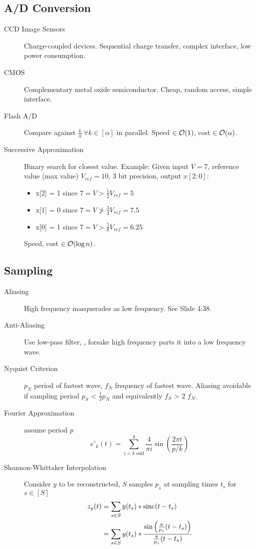 
\subsection{A/D Conversion}
\begin{description}
	\item[CCD Image Sensors] Charge-coupled devices. Sequential charge transfer,
	complex interface, low power consumption.
	\item[CMOS] Complementary metal oxide semiconductor. Cheap, random access,
	simple interface.
	\item[Flash A/D] Compare against $\frac{k}{\alpha} \ \forall k \in [\alpha]$
	in parallel. Speed $\in \operatorname{\mathcal{O}}(1)$, cost $\in \operatorname{\mathcal{O}}(\alpha)$.
	\item[Successive Approximation] Binary search for closest value. Example:
	Given input $V = 7$, reference value (max value) $V_{ref} = 10$, 3 bit
	precision,
	output $x[2:0]$:
	\begin{itemize}
		\item x[2] = 1 since $7 = V > \frac{1}{2} V_{ref} = 5$
		\item x[1] = 0 since $7 = V \ngtr \frac{3}{4} V_{ref} = 7.5$
		\item x[0] = 1 since $7 = V > \frac{5}{8} V_{ref} = 6.25$
	\end{itemize}
	Speed, cost $\in \operatorname{\mathcal{O}}(\log n)$.
\end{description}

\subsection{Sampling}

\begin{description}
	\item[Aliasing] High frequency masquerades as low frequency. See Slide 4:38.
	\item[Anti-Aliasing] Use low-pass filter, \ie, forsake high frequency parts
	 it into a low frequency wave.
	\item[Nyquist Criterion] $p_N$ period of fastest wave, $f_N$ frequency of
	fastest wave. Aliasing avoidable if sampling period $p_S$ < $\frac{1}{2} p_N$
	and equivalently $f_S$ > 2 $f_N$.
	\item[Fourier Approximation] assume period $p$
	\[ 
	e'_k(t) = \sum^{k}_{i < k \text{ odd}}\frac{4}{\pi i} \sin\left(\frac{2\pi t}
	{p/k}\right)
	\]
	\item[Shannon-Whittaker Interpolation] Consider $y$ to be reconstructed, $S$
	samples $p_s$ at sampling times $t_s$ for $s \in [S]$
	\begin{align*}
	z_y(t) 	&= \sum_{s \in S} y(t_s) * \operatorname{sinc}(t - t_s)\\
	 		&= \sum_{s \in S} y(t_s) * \frac{\sin\left(\frac{\pi}{p_s}(t-t_s)\right)}
	 		{\frac{\pi}{p_s}(t-t_s)}
	\end{align*}
\end{description}

